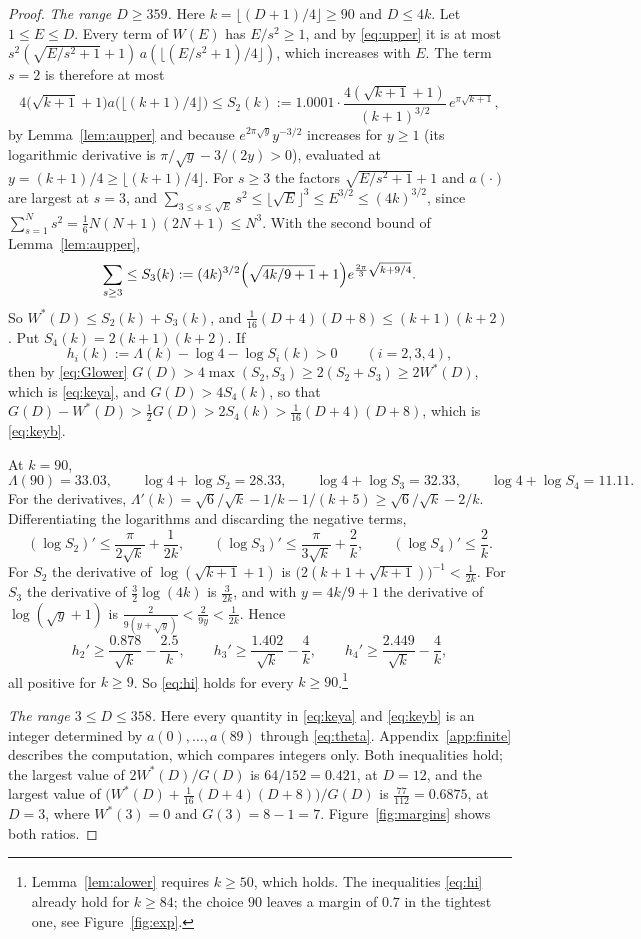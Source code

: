 \documentclass[11pt]{amsart}
\theoremstyle{definition}
\newcommand{\Kzero}{90}
\begin{document}
\begin{proof}
\emph{The range $D\ge359$.} Here $k=\lfloor(D+1)/4\rfloor\ge\Kzero$ and $D\le4k$. Let $1\le E\le D$. Every term of $W(E)$ has $E/s^2\ge1$, and by \eqref{eq:upper} it is at most $s^2(\sqrt{E/s^2+1}+1)\,a(\lfloor(E/s^2+1)/4\rfloor)$, which increases with $E$. The term $s=2$ is therefore at most
\[
4\bigl(\sqrt{k+1}+1\bigr)a\bigl(\lfloor(k+1)/4\rfloor\bigr)\le S_2(k):=1.0001\cdot\frac{4(\sqrt{k+1}+1)}{(k+1)^{3/2}}\,e^{\pi\sqrt{k+1}},
\]
by Lemma~\ref{lem:aupper} and because $e^{2\pi\sqrt y}y^{-3/2}$ increases for $y\ge1$ (its logarithmic derivative is $\pi/\sqrt y-3/(2y)>0$), evaluated at $y=(k+1)/4\ge\lfloor(k+1)/4\rfloor$. For $s\ge3$ the factors $\sqrt{E/s^2+1}+1$ and $a(\cdot)$ are largest at $s=3$, and $\sum_{3\le s\le\sqrt E}s^2\le\lfloor\sqrt E\rfloor^3\le E^{3/2}\le(4k)^{3/2}$, since $\sum_{s=1}^Ns^2=\frac16N(N+1)(2N+1)\le N^3$. With the second bound of Lemma~\ref{lem:aupper},
\[
\sum_{s\ge3}\le S_3(k):=(4k)^{3/2}\Bigl(\sqrt{4k/9+1}+1\Bigr)e^{\frac{2\pi}3\sqrt{k+9/4}}.
\]
So $W^*(D)\le S_2(k)+S_3(k)$, and $\tfrac1{16}(D+4)(D+8)\le(k+1)(k+2)$. Put $S_4(k)=2(k+1)(k+2)$. If
\begin{equation}\label{eq:hi}
h_i(k):=\Lambda(k)-\log4-\log S_i(k)>0\qquad(i=2,3,4),
\end{equation}
then by \eqref{eq:Glower} $G(D)>4\max(S_2,S_3)\ge2(S_2+S_3)\ge2W^*(D)$, which is \eqref{eq:keya}, and $G(D)>4S_4(k)$, so that $G(D)-W^*(D)>\tfrac12G(D)>2S_4(k)>\tfrac1{16}(D+4)(D+8)$, which is \eqref{eq:keyb}.

At $k=\Kzero$,
\[
\Lambda(\Kzero)=33.03,\qquad \log4+\log S_2=28.33,\qquad \log4+\log S_3=32.33,\qquad\log4+\log S_4=11.11 .
\]
For the derivatives, $\Lambda'(k)=\sqrt6/\sqrt k-1/k-1/(k+5)\ge\sqrt6/\sqrt k-2/k$. Differentiating the logarithms and discarding the negative terms,
\[
(\log S_2)'\le\frac{\pi}{2\sqrt k}+\frac1{2k},\qquad(\log S_3)'\le\frac{\pi}{3\sqrt k}+\frac{2}{k},\qquad (\log S_4)'\le\frac2k .
\]
For $S_2$ the derivative of $\log(\sqrt{k+1}+1)$ is $\bigl(2(k+1+\sqrt{k+1})\bigr)^{-1}<\frac1{2k}$. For $S_3$ the derivative of $\frac32\log(4k)$ is $\frac3{2k}$, and with $y=4k/9+1$ the derivative of $\log(\sqrt y+1)$ is $\frac{2}{9(y+\sqrt y)}<\frac2{9y}<\frac1{2k}$. Hence
\[
h_2'\ge\frac{0.878}{\sqrt k}-\frac{2.5}k,\qquad h_3'\ge\frac{1.402}{\sqrt k}-\frac{4}{k},\qquad h_4'\ge\frac{2.449}{\sqrt k}-\frac4k,
\]
all positive for $k\ge9$. So \eqref{eq:hi} holds for every $k\ge\Kzero$.\footnote{Lemma~\ref{lem:alower} requires $k\ge50$, which holds. The inequalities \eqref{eq:hi} already hold for $k\ge84$; the choice $\Kzero$ leaves a margin of $0.7$ in the tightest one, see Figure~\ref{fig:exp}.}

\emph{The range $3\le D\le358$.} Here every quantity in \eqref{eq:keya} and \eqref{eq:keyb} is an integer determined by $a(0),\dots,a(89)$ through \eqref{eq:theta}. Appendix~\ref{app:finite} describes the computation, which compares integers only. Both inequalities hold; the largest value of $2W^*(D)/G(D)$ is $64/152=0.421$, at $D=12$, and the largest value of $\bigl(W^*(D)+\frac1{16}(D+4)(D+8)\bigr)/G(D)$ is $\frac{77}{112}=0.6875$, at $D=3$, where $W^*(3)=0$ and $G(3)=8-1=7$. Figure~\ref{fig:margins} shows both ratios.
\end{proof}
\end{document}
